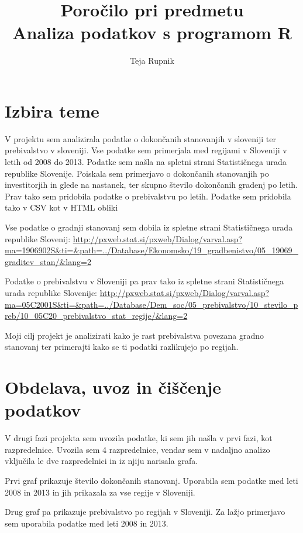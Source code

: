 \documentclass[11pt,a4paper]{article}
\begin{document}
\title{Poročilo pri predmetu \\
Analiza podatkov s programom R}
\author{Teja Rupnik}
\maketitle

\section{Izbira teme}
V projektu sem analizirala podatke o dokončanih stanovanjih v sloveniji ter prebivalstvo v sloveniji. Vse podatke sem primerjala med regijami v Sloveniji v letih od 2008 do 2013. Podatke sem našla na spletni strani Statističnega urada republike Slovenije. Poiskala sem primerjavo o dokončanih stanovanjih po investitorjih in glede na nastanek, ter skupno število dokončanih gradenj po letih. Prav tako sem pridobila podatke o prebivalstvu po letih. Podatke sem pridobila tako v CSV kot v HTML obliki

Vse podatke o gradnji stanovanj sem dobila iz spletne strani Statističnega urada republike Slovenij:
\url{http://pxweb.stat.si/pxweb/Dialog/varval.asp?ma=1906902S&ti=&path=../Database/Ekonomsko/19_gradbenistvo/05_19069_graditev_stan/&lang=2}

Podatke o prebivalstvu v Sloveniji pa prav tako iz spletne strani Statističnega urada republike Slovenije:
\url{http://pxweb.stat.si/pxweb/Dialog/varval.asp?ma=05C2001S&ti=&path=../Database/Dem_soc/05_prebivalstvo/10_stevilo_preb/10_05C20_prebivalstvo_stat_regije/&lang=2}

Moji cilj projekt je analizirati kako je rast prebivalstva povezana gradno stanovanj ter primerajti kako se ti podatki razlikujejo po regijah.

\newpage
\section{Obdelava, uvoz in čiščenje podatkov}
V drugi fazi projekta sem uvozila podatke, ki sem jih našla v prvi fazi, kot razpredelnice. Uvozila sem 4 razpredelnice, vendar sem v nadaljno analizo vključila le dve razpredelnici in iz njiju narisala grafa.

Prvi graf prikazuje število dokončanih stanovanj. Uporabila sem podatke med leti 2008 in 2013 in jih prikazala za vse regije v Sloveniji.


Drug graf pa prikazuje prebivalstvo po regijah v Sloveniji. Za lažjo primerjavo sem uporabila podatke med leti 2008 in 2013.

\end{document}
